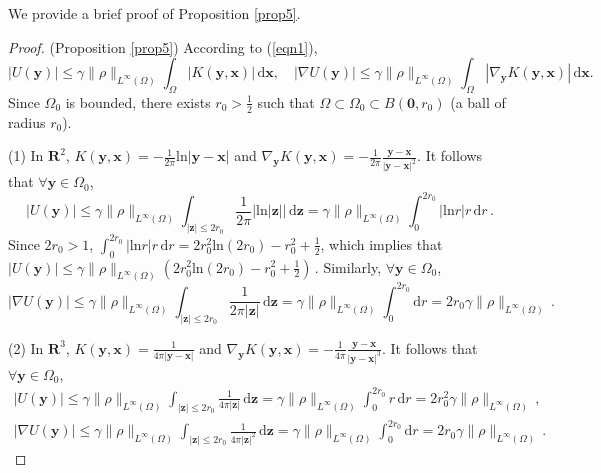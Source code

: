 \documentclass[final,hidelinks,onefignum,onetabnum]{siamart251216}
\begin{document}
We provide a brief proof of Proposition \ref{prop5}.
\begin{proof}
(Proposition \ref{prop5}) According to (\ref{eqn1}),
\[
|U(\mathbf{y})| \leq \gamma \|\rho\|_{L^\infty(\Omega)} \int_\Omega |K(\mathbf{y}, \mathbf{x})| \, \mathrm{d}\mathbf{x},\quad  |\nabla U(\mathbf{y})| \leq \gamma \|\rho\|_{L^\infty(\Omega)} \int_\Omega |\nabla_{\mathbf{y}}K(\mathbf{y}, \mathbf{x})| \, \mathrm{d}\mathbf{x}.
\]
Since $\Omega_0$ is bounded, there exists $r_0>\frac{1}{2}$ such that $\Omega\subset\Omega_0\subset B(\mathbf{0}, r_0)$ (a ball of radius $r_0$).

(1) In $\mathbf{R}^2$, $K(\mathbf{y},\mathbf{x})=-\frac{1}{2\pi}\mathrm{ln}|\mathbf{y}-\mathbf{x}|$ and $\nabla_{\mathbf{y}}K(\mathbf{y}, \mathbf{x})=-\frac{1}{2\pi}\frac{\mathbf{y}-\mathbf{x}}{|\mathbf{y}-\mathbf{x}|^2}$. It follows that $\forall\mathbf{y}\in\Omega_0$,
\[
|U(\mathbf{y})| \leq \gamma \|\rho\|_{L^\infty(\Omega)} \int_{|\mathbf{z}| \le 2 r_0} \frac{1}{2\pi}\big|\mathrm{ln}|\mathbf{z}|\big| \, \mathrm{d}\mathbf{z} = \gamma \|\rho\|_{L^\infty(\Omega)} \int_0^{2 r_0}|\mathrm{ln}r|r\,\mathrm{d}r\,.
\]
Since $2 r_0>1$, $\int_0^{2 r_0}|\mathrm{ln}r|r\,\mathrm{d}r=2r_0^2\mathrm{ln}(2r_0)-r_0^2+\frac{1}{2}$, which implies that
$
|U(\mathbf{y})| \leq \gamma \|\rho\|_{L^\infty(\Omega)}\left(2 r_0^2\mathrm{ln}(2 r_0)-r_0^2+\frac{1}{2}\right)\,.
$
Similarly, $\forall\mathbf{y}\in\Omega_0$,
\[
 |\nabla U(\mathbf{y})| \leq \gamma \|\rho\|_{L^\infty(\Omega)} \int_{|\mathbf{z}| \le 2 r_0}\frac{1}{2\pi |\mathbf{z}|} \, \mathrm{d}\mathbf{z}=\gamma \|\rho\|_{L^\infty(\Omega)} \int_0^{2 r_0}\mathrm{d}r=2r_0\gamma\|\rho\|_{L^\infty(\Omega)}\,.
\]

(2) In $\mathbf{R}^3$, $K(\mathbf{y},\mathbf{x})=\frac{1}{4\pi|\mathbf{y}-\mathbf{x}|}$ and $\nabla_{\mathbf{y}}K(\mathbf{y}, \mathbf{x})=-\frac{1}{4\pi}\frac{\mathbf{y}-\mathbf{x}}{|\mathbf{y}-\mathbf{x}|^3}$. It follows that $\forall\mathbf{y}\in\Omega_0$,
\begin{align*}
|U(\mathbf{y})| \leq \gamma \|\rho\|_{L^\infty(\Omega)} \int_{|\mathbf{z}| \le 2 r_0} \frac{1}{4\pi |\mathbf{z}|}\, \mathrm{d}\mathbf{z} = \gamma \|\rho\|_{L^\infty(\Omega)} \int_0^{2r_0}r\,\mathrm{d}r=2r_0^2 \gamma \|\rho\|_{L^\infty(\Omega)}\,, \\
|\nabla U(\mathbf{y})| \leq \gamma \|\rho\|_{L^\infty(\Omega)} \int_{|\mathbf{z}| \le 2r_0} \frac{1}{4\pi |\mathbf{z}|^2}\, \mathrm{d}\mathbf{z} = \gamma \|\rho\|_{L^\infty(\Omega)} \int_0^{2r_0} \mathrm{d}r=2r_0 \gamma \|\rho\|_{L^\infty(\Omega)}\,. 
\end{align*}
\end{proof}
\end{document}
